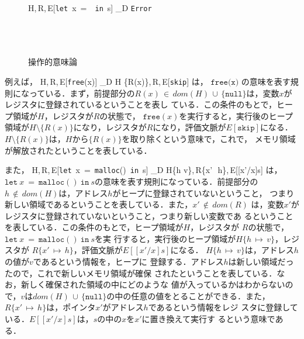 \begin{figure}[h]
    \small
    {\langle H,\,R,\,E[\texttt{let}\ x\ =\ \ \texttt{in}\ s] \rangle
    \longrightarrow_{D} \texttt{Error}}
    ~\\
    ~\\
    ~\\
    ~\\
  \caption{操作的意味論}
  \label{semantics}
\end{figure}

例えば，
{\small
{} {\langle
H,\,R,\,E[\texttt{free}(x)] \rangle \longrightarrow_{D} \langle H
\setminus \{R(x)\},\,R,\,E[\texttt{skip}] \rangle}}
は，
$\texttt{free(x)}$
の意味を表す規則になっている．まず，前提部分の$R(x)\,\in \,dom(H) \,\cup
\,\{\texttt{null}\}$は，変数$x$がレジスタに登録されているということを表し
ている．この条件のもとで，ヒープ領域が$H$，レジスタが$R$の状態で，
$\texttt{free}(x)$を実行すると，実行後のヒープ領域が$H \setminus
\{R(x)\}$になり，レジスタが$R$になり，評価文脈が$E[\texttt{skip}]$になる．
$H \setminus \{R(x)\}$は，$H$から$\{R(x)\}$を取り除くという意味で，これで，
メモリ領域が解放されたということを表している．

また，
{\small
{} {\langle
H,\,R,\,E[\texttt{let}\ x\ =\ \texttt{malloc}()\ \texttt{in}\ s] \rangle
\longrightarrow_{D} \langle H\{h\,\mapsto\,v\},\,R\{x'\,\mapsto
\,h\},\,E[[x'/x]s] \rangle}}
は，$\texttt{let}\ x\ =\ \texttt{malloc}()\
\texttt{in}\ s$の意味を表す規則になっている．前提部分の
$h\,\notin\,dom(H)$は，アドレス$h$がヒープに登録されていないということ，
つまり新しい領域であるということを表している．また，$x'\,\notin\,dom(R)$
は，変数$x'$がレジスタに登録されていないということ，つまり新しい変数であ
るということを表している．この条件のもとで，ヒープ領域が$H$，レジスタが
$R$の状態で，$\texttt{let}\ x\ =\ \texttt{malloc}()\ \texttt{in}\ s$を実
行すると，実行後のヒープ領域が$H\{h\,\mapsto\,v\}$，レジスタが
$R\{x'\,\mapsto\,h\}$，評価文脈が$E[[x'/x]s]$になる．
$H\{h\,\mapsto\,v\}$は，アドレス$h$の値が$v$であるという情報を，ヒープに
登録する．アドレス$h$は新しい領域だったので，これで新しいメモリ領域が確保
されたということを表している．なお，新しく確保された領域の中にどのような
値が入っているかはわからないので，$v$は$dom(H) \,\cup
\,\{\texttt{null}\}$の中の任意の値をとることができる．また，
$R\{x'\,\mapsto\,h\}$は，ポインタ$x'$がアドレス$h$であるという情報をレジ
スタに登録している．$E[[x'/x]s]$は，$s$の中の$x$を$x'$に置き換えて実行す
るという意味である．


